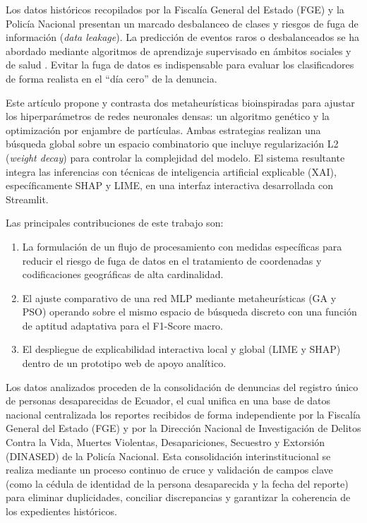 \documentclass[conference]{IEEEtran}
\begin{document}
Los datos históricos recopilados por la Fiscalía General del Estado (FGE) y la Policía Nacional presentan un marcado desbalanceo de clases y riesgos de fuga de información (\textit{data leakage}). La predicción de eventos raros o desbalanceados se ha abordado mediante algoritmos de aprendizaje supervisado en ámbitos sociales y de salud \cite{ruizrizzo2022predicting}. Evitar la fuga de datos es indispensable para evaluar los clasificadores de forma realista en el ``día cero'' de la denuncia.

Este artículo propone y contrasta dos metaheurísticas bioinspiradas para ajustar los hiperparámetros de redes neuronales densas: un algoritmo genético y la optimización por enjambre de partículas. Ambas estrategias realizan una búsqueda global sobre un espacio combinatorio que incluye regularización L2 (\textit{weight decay}) para controlar la complejidad del modelo. El sistema resultante integra las inferencias con técnicas de inteligencia artificial explicable (XAI), específicamente SHAP y LIME, en una interfaz interactiva desarrollada con Streamlit.

Las principales contribuciones de este trabajo son: 
\begin{enumerate}
    \item La formulación de un flujo de procesamiento con medidas específicas para reducir el riesgo de fuga de datos en el tratamiento de coordenadas y codificaciones geográficas de alta cardinalidad.
    \item El ajuste comparativo de una red MLP mediante metaheurísticas (GA y PSO) operando sobre el mismo espacio de búsqueda discreto con una función de aptitud adaptativa para el F1-Score macro.
    \item El despliegue de explicabilidad interactiva local y global (LIME y SHAP) dentro de un prototipo web de apoyo analítico.
\end{enumerate}

Los datos analizados proceden de la consolidación de denuncias del registro único de personas desaparecidas de Ecuador, el cual unifica en una base de datos nacional centralizada los reportes recibidos de forma independiente por la Fiscalía General del Estado (FGE) y por la Dirección Nacional de Investigación de Delitos Contra la Vida, Muertes Violentas, Desapariciones, Secuestro y Extorsión (DINASED) de la Policía Nacional. Esta consolidación interinstitucional se realiza mediante un proceso continuo de cruce y validación de campos clave (como la cédula de identidad de la persona desaparecida y la fecha del reporte) para eliminar duplicidades, conciliar discrepancias y garantizar la coherencia de los expedientes históricos.
\end{document}
